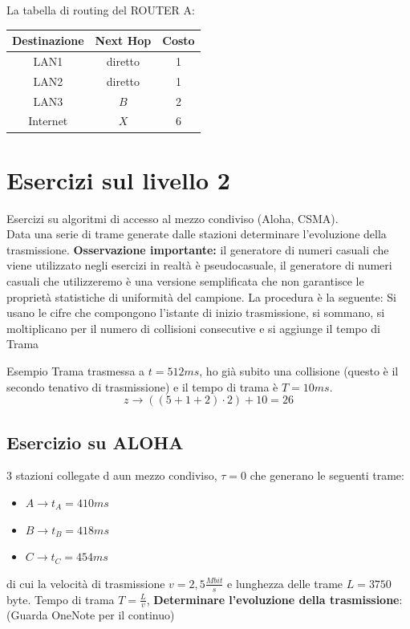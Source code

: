 \documentclass[a4paper]{article}
\begin{document}
La tabella di routing del ROUTER A:

\begin{table}[H]
    \centering
    \begin{tabular}{c|c|c}
        \textbf{Destinazione} & \textbf{Next Hop} & \textbf{Costo} \\ \hline
        LAN1 & diretto  & 1 \\
        LAN2 & diretto & 1 \\
        LAN3 & $B$ & 2\\
        Internet & $X$ & 6 \\
    \end{tabular}
\end{table}

\section{Esercizi sul livello 2}

Esercizi su algoritmi di accesso al mezzo condiviso (Aloha, CSMA).
\\
Data una serie di trame generate dalle stazioni determinare l'evoluzione
della trasmissione.
\textbf{Osservazione importante:} il generatore di numeri casuali che viene utilizzato negli esercizi
in realtà è pseudocasuale, il generatore di numeri casuali che utilizzeremo è una versione semplificata
che non garantisce le proprietà statistiche di uniformità del campione.
La procedura è la seguente:
Si usano le cifre che compongono l'istante di inizio trasmissione, si sommano, 
    si moltiplicano per il numero di collisioni consecutive e si aggiunge il tempo di Trama
    \begin{examplebox}{Esempio}
        Trama trasmessa a $t = 512ms$, ho già subito una collisione (questo è il secondo tenativo di trasmissione) e il tempo di trama è $T = 10ms$.
        \[z \rightarrow ((5+1+2)\cdot 2) + 10 = 26\]
    \end{examplebox}

\subsection{Esercizio su ALOHA}

3 stazioni collegate d aun mezzo condiviso, $\tau = 0$ che generano le seguenti trame:
\begin{itemize}
    \item $A \rightarrow t_A = 410ms$
    \item $B \rightarrow t_B = 418ms$
    \item $C \rightarrow t_C = 454ms$
\end{itemize}
di cui la velocità di trasmissione $v = 2,5\frac{Mbit}{s}$ e lunghezza delle trame $L = 3750$ byte.
Tempo di trama $T = \frac{L}{v}$,
\textbf{Determinare l'evoluzione della trasmissione}:
(Guarda OneNote per il continuo)
\end{document}
